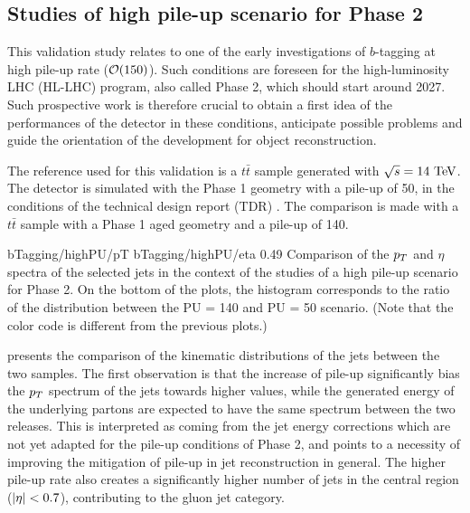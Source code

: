     \subsection{Studies of high pile-up scenario for Phase 2}

    This validation study relates to one of the early investigations of
    $b$-tagging at high pile-up rate ($\mathcal{O}(150)$). Such conditions are
    foreseen for the high-luminosity LHC (HL-LHC) program, also called Phase 2,
    which should start around 2027. Such prospective work is therefore crucial
    to obtain a first idea of the performances of the detector in these
    conditions, anticipate possible problems and guide the orientation of the
    development for object reconstruction.

    The reference used for this validation is a $t\bar{t}$ sample generated with
    $\sqrt{s} = 14~\text{TeV}$. The detector is simulated with the Phase 1 geometry
    with a pile-up of 50, in the conditions of the technical design report (TDR)
    \cite{Phase1TDR}. The comparison is made with a $t\bar{t}$ sample with a
    Phase 1 aged geometry and a pile-up of 140.

                     {bTagging/highPU/pT}
                     {bTagging/highPU/eta}
                     {0.49}
                     {Comparison of the $p_T$ and $\eta$ spectra of the selected
                     jets in the context of the studies of a high pile-up
                     scenario for Phase 2.  On the bottom of the plots, the
                     histogram corresponds to the ratio of the distribution
                     between the PU = 140 and PU = 50 scenario.  (Note that the
                     color code is different from the previous plots.)}

     presents the comparison of the
    kinematic distributions of the jets between the two samples. The first
    observation is that the increase of pile-up significantly bias the $p_T$
    spectrum of the jets towards higher values, while the generated energy of
    the underlying partons are expected to have the same spectrum between the
    two releases. This is interpreted as coming from the jet energy corrections
    which are not yet adapted for the pile-up conditions of Phase 2, and points
    to a necessity of improving the mitigation of pile-up in jet reconstruction
    in general.  The higher pile-up rate also creates a significantly higher
    number of jets in the central region ($\left| \eta \right| < 0.7$), contributing to the
    gluon jet category.

